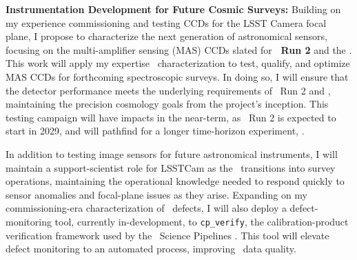 
\textbf{Instrumentation Development for Future Cosmic Surveys:}
Building on my experience commissioning and testing CCDs for the LSST Camera focal plane, I propose to characterize the next generation of astronomical sensors, focusing on the multi-amplifier sensing (MAS) CCDs slated for \textbf{\DESI\ Run 2} and the \specsfive. This work will apply my expertise \LSSTCam\ characterization to test, qualify, and optimize MAS CCDs for forthcoming spectroscopic surveys. In doing so, I will ensure that the detector performance meets the underlying requirements of \DESI\ Run 2 and \specsfive, maintaining the precision cosmology goals from the project's inception.
This testing campaign will have impacts in the near-term, as \DESI\ Run 2 is expected to start in 2029, and will pathfind for a longer time-horizon experiment, \specsfive.

In addition to testing image sensors for future astronomical instruments, 
I will maintain a support-scientist role for LSSTCam as the \LSST\ transitions into survey operations, maintaining the operational knowledge needed to respond quickly to sensor anomalies and focal-plane issues as they arise.
Expanding on my commissioning-era characterization of \LSSTCam\ defects, I will also deploy a defect-monitoring tool, currently in-development, to \texttt{cp\_verify},
the calibration-product verification framework used by the \LSST\ Science Pipelines 
\cite{10.71929/rubin/2570545}. This tool will elevate defect monitoring to an automated process, improving \LSST\ data quality.